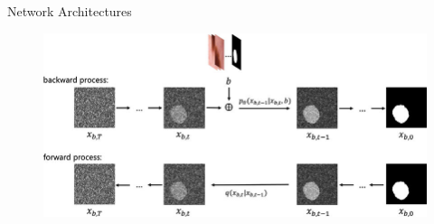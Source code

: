\begin{frame}[allowframebreaks]{Network Architectures}
\framebreak
\begin{figure}
    \centering
    \includegraphics[height=0.9\textheight, width=\textwidth, keepaspectratio]{images/diffusion/architecture-forward-backward.png}
\end{figure}
\end{frame}

